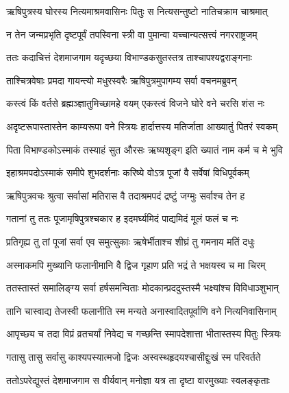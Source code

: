 \twolineshloka
{ऋषिपुत्रस्य घोरस्य नित्यमाश्रमवासिनः}
{पितुः स नित्यसन्तुष्टो नातिचक्राम चाश्रमात्} %

\twolineshloka
{न तेन जन्मप्रभृति दृष्टपूर्वं तपस्विना}
{स्त्री वा पुमान्वा यच्चान्यत्सत्त्वं नगरराष्ट्रजम्} %

\twolineshloka
{ततः कदाचित्तं देशमाजगाम यदृच्छया}
{विभाण्डकसुतस्तत्र ताश्चापश्यद्वराङ्गनाः} %

\twolineshloka
{ताश्चित्रवेषाः प्रमदा गायन्त्यो मधुरस्वरैः}
{ऋषिपुत्रमुपागम्य सर्वा वचनमब्रुवन्} %

\twolineshloka
{कस्त्वं किं वर्तसे ब्रह्मञ्ज्ञातुमिच्छामहे वयम्}
{एकस्त्वं विजने घोरे वने चरसि शंस नः} %

\twolineshloka
{अदृष्टरूपास्तास्तेन काम्यरूपा वने स्त्रियः}
{हार्दात्तस्य मतिर्जाता आख्यातुं पितरं स्वकम्} %

\twolineshloka
{पिता विभाण्डकोऽस्माकं तस्याहं सुत औरसः}
{ऋष्यशृङ्ग इति ख्यातं नाम कर्म च मे भुवि} %

\twolineshloka
{इहाश्रमपदोऽस्माकं समीपे शुभदर्शनाः}
{करिष्ये वोऽत्र पूजां वै सर्वेषां विधिपूर्वकम्} %

\twolineshloka
{ऋषिपुत्रवचः श्रुत्वा सर्वासां मतिरास वै}
{तदाश्रमपदं द्रष्टुं जग्मुः सर्वाश्च तेन ह} %

\twolineshloka
{गतानां तु ततः पूजामृषिपुत्रश्चकार ह}
{इदमर्घ्यमिदं पाद्यमिदं मूलं फलं च नः} %

\twolineshloka
{प्रतिगृह्य तु तां पूजां सर्वा एव समुत्सुकाः}
{ऋषेर्भीताश्च शीघ्रं तु गमनाय मतिं दधुः} %

\twolineshloka
{अस्माकमपि मुख्यानि फलानीमानि वै द्विज}
{गृहाण प्रति भद्रं ते भक्षयस्व च मा चिरम्} %

\twolineshloka
{ततस्तास्तं समालिङ्ग्य सर्वा हर्षसमन्विताः}
{मोदकान्प्रददुस्तस्मै भक्ष्यांश्च विविधाञ्शुभान्} %

\twolineshloka
{तानि चास्वाद्य तेजस्वी फलानीति स्म मन्यते}
{अनास्वादितपूर्वाणि वने नित्यनिवासिनाम्} %

\twolineshloka
{आपृच्छ्य च तदा विप्रं व्रतचर्यां निवेद्य च}
{गच्छन्ति स्मापदेशात्ता भीतास्तस्य पितुः स्त्रियः} %

\twolineshloka
{गतासु तासु सर्वासु काश्यपस्यात्मजो द्विजः}
{अस्वस्थहृदयश्चासीद्दुःखं स्म परिवर्तते} %

\twolineshloka
{ततोऽपरेद्युस्तं देशमाजगाम स वीर्यवान्}
{मनोज्ञा यत्र ता दृष्टा वारमुख्याः स्वलङ्कृताः} %

